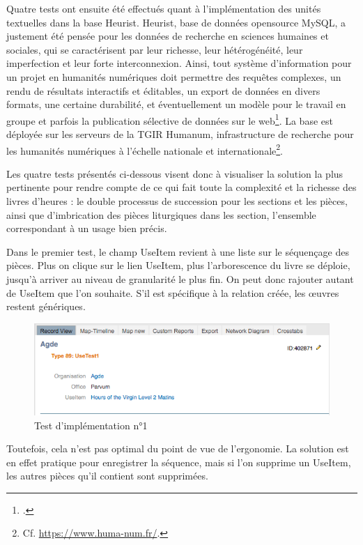\documentclass[a4paper,12pt,twoside]{book}
\begin{document}
	Quatre tests ont ensuite été effectués quant à l'implémentation des unités textuelles dans la base Heurist. Heurist, base de données opensource MySQL, a justement été pensée pour les données de recherche en sciences humaines et sociales, qui se caractérisent par leur richesse, leur hétérogénéité, leur imperfection et leur forte interconnexion. Ainsi, tout système d’information pour un projet en humanités numériques doit permettre des requêtes complexes, un rendu de résultats interactifs et éditables, un export de données en divers formats, une certaine durabilité, et éventuellement un modèle pour le travail en groupe et parfois la publication sélective de données sur le web\footcite{bd_Heurist}. La base est déployée sur les serveurs de la TGIR Humanum, infrastructure de recherche pour les humanités numériques à l'échelle nationale et internationale\footnote{Cf. \url{https://www.huma-num.fr/}.}. 
	
	Les quatre tests présentés ci-dessous visent donc à visualiser la solution la plus pertinente pour rendre compte de ce qui fait toute la complexité et la richesse des livres d'heures : le double processus de succession pour les sections et les pièces, ainsi que d'imbrication des pièces liturgiques dans les section, l'ensemble correspondant à un usage bien précis. 
	
	Dans le premier test, le champ \og UseItem\fg{} revient à une liste sur le séquençage des pièces. Plus on clique sur le lien \og UseItem\fg{}, plus l’arborescence du livre se déploie, jusqu’à arriver au niveau de granularité le plus fin. On peut donc rajouter autant de \og UseItem\fg{} que l’on souhaite. S’il est spécifique à la relation créée, les œuvres restent génériques.
	
    \begin{figure}[!h]
    \centering
    \includegraphics[width=15cm]{img/Modelisation/Tests_Implementation/UseTest1.png}
    \caption{Test d'implémentation n°1}
    \end{figure}
	
 Toutefois, cela n’est pas optimal du point de vue de l’ergonomie. La solution est en effet pratique pour enregistrer la séquence, mais si l’on supprime un \og UseItem\fg{}, les autres pièces qu'il contient sont supprimées. \\
 
\end{document}
